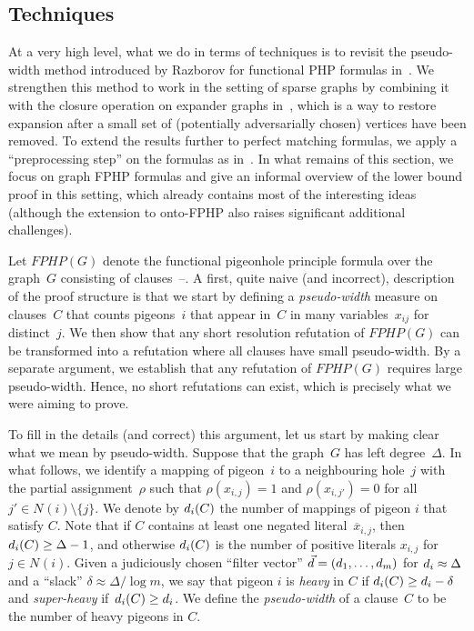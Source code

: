 \documentclass{theoretics}
\newcommand{\set}[1]{\{ #1 \}}
\newcommand{\olnot}[1]{\overline{#1}}
\newcommand{\introduceterm}[1]{{\emph{#1}}}
\newcommand{\clc}{\ensuremath{C}}
\newcommand{\restrrho}{\rho}
\newcommand{\formulaformat}[1]{\mathit{#1}}
\newcommand{\graphfphpnot}[1][G]{\formulaformat{FPHP}({#1})}
\newcommand{\heavy}{heavy\xspace}
\newcommand{\sheavy}{super-heavy\xspace}
\newcommand{\superheavy}{\sheavy}
\newcommand{\GFPHP}{G\text{-}FPHP}
\renewcommand{\GFPHP}{\graphfphpnot[G]}
\newcommand{\neigh}[2][]{N_{{#1}}(#2)}
\newcommand{\GdegMax}{\Delta}
\newcommand{\gdegmax}{\GdegMax}
\newcommand{\thr}[1]{ \ensuremath d_{{#1}} }
\newcommand{\vecthr}{\vec{d}}
\newcommand{\pseudowidth}{pseudo-width\xspace}
\newcommand{\squeezesubsection}[1]{\subsection{#1}}
\numberwithin{equation}{section}
\begin{document}
   
\squeezesubsection{Techniques}
\label{sec:intro_techniques}

At a very high level, what we do in terms of techniques is to revisit
the pseudo-width method introduced by Razborov for functional PHP
formulas in~\cite{Razborov03ResolutionLowerBoundsWFPHP}.  We
strengthen this method to work in the setting of sparse graphs by
combining it with the closure operation on expander
graphs in~\cite{ABRW04Pseudorandom,AR03LowerBounds}, which is a way to
restore expansion after a small set of (potentially adversarially
chosen) vertices have been removed.
To extend the results further to perfect matching formulas, we apply a
``preprocessing step'' on the formulas as
in~\cite{Razborov04ResolutionLowerBoundsPM}. 
In what remains of this section, we focus on graph FPHP formulas and
give an informal overview of the lower bound proof in this setting,
which already contains most of the interesting ideas
(although the extension to onto-FPHP also raises significant
additional challenges).

Let
$\GFPHP$
denote the functional 
pigeonhole principle
formula over the graph~$G$ consisting of 
\mbox{clauses
  --.}
A first, quite naive (and incorrect), description of the proof
structure is that we start by defining a 
\introduceterm{\pseudowidth{}} measure on clauses~$\clc$ that counts
pigeons~$i$ that 
appear  in~$\clc$ in many variables~$x_{ij}$
for distinct~$j$.
We then show that
any short resolution refutation of
$\GFPHP$ can be transformed into a refutation where all clauses have
small \pseudowidth. By a separate argument, 
we establish that any refutation of
$\GFPHP$ 
requires large \pseudowidth.
Hence,  no short refutations can exist, which is precisely what we
were aiming to prove.


To fill in the details (and correct) this argument, let us start by
making clear what we mean by \pseudowidth. 
Suppose that the graph~$G$ has left degree~$\gdegmax$.
In what follows, we 
identify a mapping of pigeon~$i$ to a neighbouring hole~$j$ with the partial
assignment~$\restrrho$ such that
$\restrrho (x_{i,j}) = 1$ and
$\restrrho (x_{i,j'}) = 0$ for all $j' \in \neigh{i} \setminus \set{j}$.
We denote by 
$\thr{i}(\clc)$ 
the number of mappings of pigeon $i$ that
satisfy $\clc$.
Note that if
$\clc$ contains at least
one negated literal~$\olnot{x}_{i,j}$,
then
$\thr{i}(\clc) \geq \gdegmax - 1$,
and otherwise
$\thr{i}(\clc)$
is the number of positive literals
$x_{i,j}$ for $j \in \neigh{i}$.
Given a judiciously  chosen
``filter vector''
$\vecthr =(\thr{1}, \ldots, \thr{m})$
for
$\thr{i} \approx \gdegmax$
and a ``slack''
$\delta \approx \gdegmax / \log m$,
we 
say that
pigeon $i$ is \introduceterm{\heavy{}} in 
$\clc$
if $\thr{i}(\clc) \ge \thr{i} - \delta$ and
\introduceterm{\superheavy{}} 
\mbox{if  $\thr{i}(\clc) \ge \thr{i}$.}
We define the \introduceterm{\pseudowidth{}} of 
a clause~$\clc$ to be
the number of \heavy pigeons in $\clc$.
\end{document}
